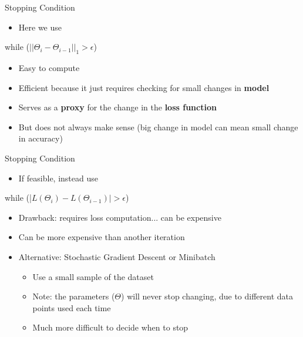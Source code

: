 \documentclass[aspectratio=169]{beamer}
\newenvironment{noindentitemize}
{ \begin{itemize}
 \setlength{\itemsep}{1.5ex}
  \setlength{\parsep}{0pt}   
  \setlength{\parskip}{0pt}
 \addtolength{\leftskip}{-2em}
 }
{ \end{itemize} }
\begin{document}
\begin{frame}[fragile]{Stopping Condition}

\begin{noindentitemize}
\item Here we use 
\end{noindentitemize}
\begin{SQL}
while ($||\Theta_{i} - \Theta_{i - 1}||_1 > \epsilon$)
\end{SQL}
\begin{itemize}
\item Easy to compute
\item Efficient because it just requires checking for small changes in \textbf{model}
\item Serves as a \textbf{proxy} for the change in the \textbf{loss function}
\item But does not always make sense (big change in model can mean small change in accuracy)
\end{itemize}

\end{frame}
\begin{frame}[fragile]{Stopping Condition}

\begin{itemize}
\item If feasible, instead use
\end{itemize}
\begin{SQL}
while (|$L(\Theta_{i}) - L(\Theta_{i - 1})| > \epsilon$)
\end{SQL}
\begin{itemize}
\item Drawback: requires loss computation... can be expensive
\item Can be more expensive than another iteration
\item Alternative: Stochastic Gradient Descent or Minibatch %
\begin{itemize}
\item Use a small sample of the dataset
\item Note: the parameters ($\Theta$) will never stop changing, due to different data points used each time
\item Much more difficult to decide when to stop
\end{itemize}
\end{itemize}

\end{frame}
\end{document}

